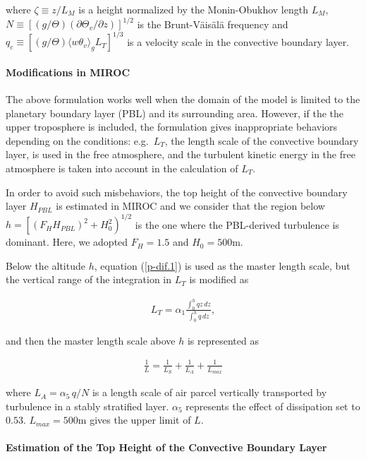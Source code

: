 where \(\zeta\equiv z/L_M\) is a height normalized by the Monin-Obukhov length \(L_M\), \(N\equiv\left[(g/\Theta)(\partial\Theta_v/\partial z)\right]^{1/2}\) is the Brunt-Väisälä frequency and
\(q_c\equiv [(g/\Theta)\langle w\theta_v \rangle_gL_T]^{1/3}\) is a velocity scale in the convective boundary layer.

\hypertarget{modifications-in-miroc}{%
\paragraph{Modifications in MIROC}\label{modifications-in-miroc}}

The above formulation works well when the domain of the model is limited to the planetary boundary layer (PBL) and its surrounding area. However, if the the upper troposphere is included, the
formulation gives inappropriate behaviors depending on the conditions: e.g.~\(L_T\), the length scale of the convective boundary layer, is used in the free atmosphere, and the turbulent kinetic energy
in the free atmosphere is taken into account in the calculation of \(L_T\).

In order to avoid such misbehaviors, the top height of the convective boundary layer \(H_{PBL}\) is estimated in MIROC and we consider that the region below
\(h=\left[(F_H H_{PBL})^2+H_0^2\right)^{1/2}\) is the one where the PBL-derived turbulence is dominant. Here, we adopted \(F_H=1.5\) and \(H_0=500\)m.

Below the altitude \(h\), equation (\ref{p-dif.1}) is used as the master length scale, but the vertical range of the integration in \(L_T\) is modified as

\begin{eqnarray}L_T=\alpha_1\frac{\displaystyle \int_0^h{qz}\,dz}{\displaystyle \int_0^h{q}\,dz},\end{eqnarray}

and then the master length scale above \(h\) is represented as

\begin{eqnarray}\frac{1}{L}=\frac{1}{L_S}+\frac{1}{L_A}+\frac{1}{L_{max}}\end{eqnarray}

where \(L_A=\alpha_5\,q/N\) is a length scale of air parcel vertically transported by turbulence in a stably stratified layer. \(\alpha_5\) represents the effect of dissipation set to \(0.53\).
\(L_{max}=500\)m gives the upper limit of \(L\).

\hypertarget{estimation-of-the-top-height-of-the-convective-boundary-layer}{%
\paragraph{Estimation of the Top Height of the Convective Boundary Layer}\label{estimation-of-the-top-height-of-the-convective-boundary-layer}}

